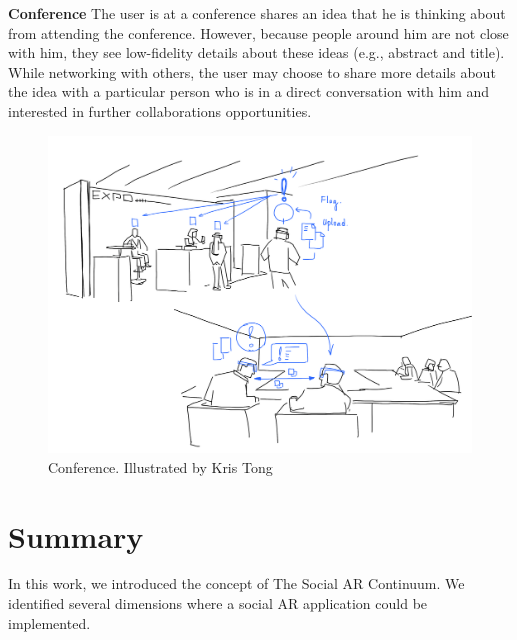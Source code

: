 \textbf{Conference}
The user is at a conference shares an idea that he is thinking about from attending the conference. However, because people around him are not close with him, they see low-fidelity details about these ideas (e.g., abstract and title). While networking with others, the user may choose to share more details about the idea  with a particular person who is in a direct conversation with him and interested in further collaborations opportunities.

\begin{figure}[H]
    \centering
    \includegraphics[width=.8\linewidth]{images/illustrations/4_Flag_On_Conference.png}
    \caption{Conference. Illustrated by Kris Tong}
    \label{fig:illustration:conference}
\end{figure}

\section{Summary}

In this work, we introduced the concept of The Social AR Continuum. We identified several dimensions where a social AR application could be implemented.
